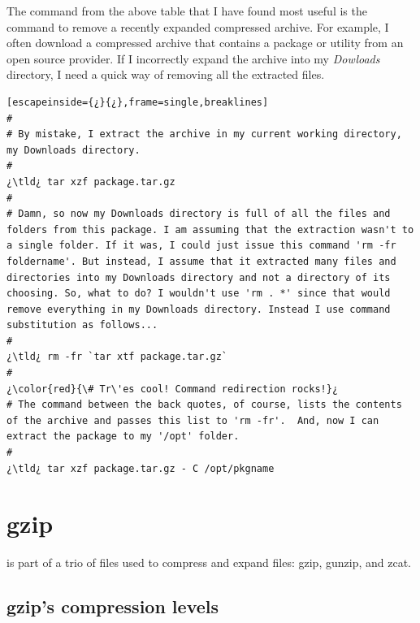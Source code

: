 The command from the above table that I have found most useful is the command to remove a recently expanded compressed archive. For example, I often download a compressed archive that contains a package or utility from an open source provider. If I incorrectly expand the archive into my \textsl{Dowloads} directory, I need a quick way of removing all the extracted files. 

\begin{lstlisting}[escapeinside={¿}{¿},frame=single,breaklines]
#
# By mistake, I extract the archive in my current working directory, my Downloads directory.
#
¿\tld¿ tar xzf package.tar.gz
#
# Damn, so now my Downloads directory is full of all the files and folders from this package. I am assuming that the extraction wasn't to a single folder. If it was, I could just issue this command 'rm -fr foldername'. But instead, I assume that it extracted many files and directories into my Downloads directory and not a directory of its choosing. So, what to do? I wouldn't use 'rm . *' since that would remove everything in my Downloads directory. Instead I use command substitution as follows...
#
¿\tld¿ rm -fr `tar xtf package.tar.gz`
#
¿\color{red}{\# Tr\'es cool! Command redirection rocks!}¿ 
# The command between the back quotes, of course, lists the contents of the archive and passes this list to 'rm -fr'.  And, now I can extract the package to my '/opt' folder.
#
¿\tld¿ tar xzf package.tar.gz - C /opt/pkgname
\end{lstlisting}	

\section{gzip}

 is part of a trio of files used to compress and expand files: gzip, gunzip, and zcat.

\subsection{gzip's compression levels}

